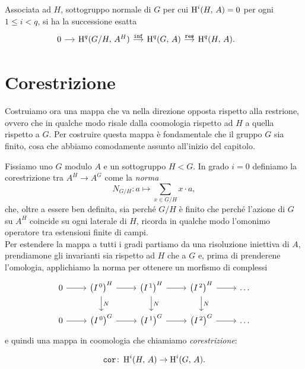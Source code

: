 \begin{corollary}
	Associata ad $ H $, sottogruppo normale di $ G $ per cui $ \operatorname{H}^i(H, \, A ) = 0 $ per ogni $ 1 \leq i < q $, si ha la successione esatta
	\[\begin{tikzcd}[column sep = small]
	0 \rar & \HH^q(G/H, \, A^H) \rar["\Inf"]
	& \HH^q(G, \, A) \rar["\Res"]
	& \HH^q(H, \, A).
	\end{tikzcd} \qquad  \]
\end{corollary}

\section{Corestrizione}
Costruiamo ora una mappa che va nella direzione opposta rispetto alla restrione, ovvero che in qualche modo risale dalla coomologia rispetto ad $ H $ a quella rispetto a $ G $. Per costruire questa mappa è fondamentale che il gruppo $ G $ sia finito, cosa che abbiamo comodamente assunto all'inizio del capitolo.

\begin{definition}[Corestrizione]
Fissiamo uno $ G $ modulo $ A $ e un sottogruppo $ H < G $. In grado $ i = 0 $ definiamo la corestrizione tra $ A^H \to A^G $  come la \emph{norma}
\[N_{G/H} \colon a \mapsto \sum_{x \in G/H} x \cdot a, \]
che, oltre a essere ben definita, sia perché $ G/H $ è finito che perché l'azione di $ G $ su $ A^H $ coincide su ogni laterale di $ H $, ricorda in qualche modo l'omonimo operatore tra estensioni finite di campi. \\

Per estendere la mappa a tutti i gradi partiamo da una risoluzione iniettiva di $ A $, prendiamone gli invarianti sia rispetto ad $ H $ che a $ G $ e, prima di prenderene l'omologia, applichiamo la norma per ottenere un morfismo di complessi
\[\begin{tikzcd}
0 \rar
& \left(I^{\,0}\right)^H \rar \dar["N"]
& \left(I^{\,1}\right)^H \rar \dar["N"]
& \left(I^{\,2}\right)^H \rar \dar["N"]
& \dots \\
0 \rar
& \left(I^{\,0}\right)^{G} \rar
& \left(I^{\,1}\right)^{G} \rar
& \left(I^{\,2}\right)^{G} \rar
& \dots
\end{tikzcd} \]
e quindi una mappa in coomologia che chiamiamo \emph{corestrizione}:

\[ \operatorname{\mathtt{cor}} \colon \operatorname{H}^i(H, \, A) \to \operatorname{H}^i(G, \, A). \]

\end{definition}

